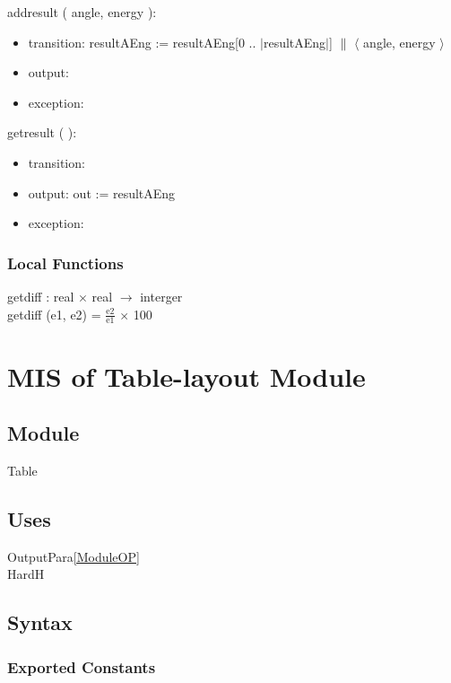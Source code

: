 \documentclass[12pt, titlepage]{article}
\begin{document}
\noindent  addresult ( angle, energy ):
\begin{itemize}
\item transition: resultAEng := resultAEng[0 .. $|$resultAEng$|$] $\|$ $\langle$
  angle, energy $\rangle$


\item output:
\item exception: 
\end{itemize}

\noindent  getresult (  ):
\begin{itemize}
\item transition: 
\item output: out := resultAEng
\item exception: 
\end{itemize}


\subsubsection{Local Functions}
getdiff : real $\times$ real $\rightarrow$ interger\\
getdiff (e1, e2) =
$\frac{\text{e2}}{\text{e1}}$ $\times$ 100


\section{MIS of Table-layout Module} \label{ModuleT} 

\subsection{Module}
Table\\

\subsection{Uses}
OutputPara\ref{ModuleOP}\\
HardH\\


\subsection{Syntax}

\subsubsection{Exported Constants}
\end{document}
